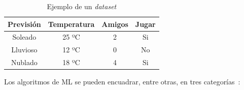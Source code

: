 \documentclass[a4paper, 12pt]{book}
\begin{document}
 \begin{table}[]
     \centering
     \begin{tabular}{| c | c | c | c |}
            \hline
          Previsión & Temperatura & Amigos & Jugar\\
          \hline
           Soleado &  25 ºC & 2 & Si \\
           \hline
           Lluvioso &  12 ºC & 0 & No\\
           \hline
           Nublado &  18 ºC & 4 & Si\\
           \hline
     \end{tabular}
     \caption{Ejemplo de un \textit{dataset}}
     \label{tab:my_dataSet}
 \end{table}
 
 Los algoritmos de ML se pueden encuadrar, entre otras, en tres categorías~\cite{James2021}: 
\end{document}
